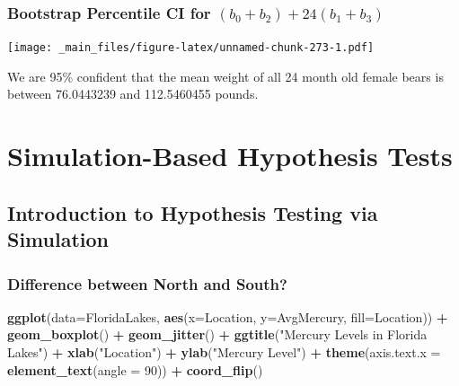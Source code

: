 \documentclass[]{book}
\newenvironment{Shaded}{\begin{snugshade}}{\end{snugshade}}
\newcommand{\KeywordTok}[1]{\textcolor[rgb]{0.13,0.29,0.53}{\textbf{#1}}}
\newcommand{\DataTypeTok}[1]{\textcolor[rgb]{0.13,0.29,0.53}{#1}}
\newcommand{\DecValTok}[1]{\textcolor[rgb]{0.00,0.00,0.81}{#1}}
\newcommand{\StringTok}[1]{\textcolor[rgb]{0.31,0.60,0.02}{#1}}
\newcommand{\OperatorTok}[1]{\textcolor[rgb]{0.81,0.36,0.00}{\textbf{#1}}}
\newcommand{\NormalTok}[1]{#1}
\begin{document}
\subsection{\texorpdfstring{Bootstrap Percentile CI for
\((b_0 + b_2) + 24(b_1+b_3)\)}{Bootstrap Percentile CI for (b\_0 + b\_2) + 24(b\_1+b\_3)}}\label{bootstrap-percentile-ci-for-b_0-b_2-24b_1b_3-1}

\texttt{[image: \_main\_files/figure-latex/unnamed-chunk-273-1.pdf]}

We are 95\% confident that the mean weight of all 24 month old female
bears is between 76.0443239 and 112.5460455 pounds.

\chapter{Simulation-Based Hypothesis
Tests}\label{simulation-based-hypothesis-tests}

\section{Introduction to Hypothesis Testing via
Simulation}\label{introduction-to-hypothesis-testing-via-simulation}

\subsection{Difference between North and
South?}\label{difference-between-north-and-south}

\begin{Shaded}
\begin{Highlighting}[]
\KeywordTok{ggplot}\NormalTok{(}\DataTypeTok{data=}\NormalTok{FloridaLakes,  }\KeywordTok{aes}\NormalTok{(}\DataTypeTok{x=}\NormalTok{Location, }\DataTypeTok{y=}\NormalTok{AvgMercury, }\DataTypeTok{fill=}\NormalTok{Location)) }\OperatorTok{+}\StringTok{ }
\StringTok{  }\KeywordTok{geom_boxplot}\NormalTok{() }\OperatorTok{+}\StringTok{   }\KeywordTok{geom_jitter}\NormalTok{() }\OperatorTok{+}\StringTok{  }\KeywordTok{ggtitle}\NormalTok{(}\StringTok{"Mercury Levels in Florida Lakes"}\NormalTok{) }\OperatorTok{+}\StringTok{ }
\StringTok{  }\KeywordTok{xlab}\NormalTok{(}\StringTok{"Location"}\NormalTok{) }\OperatorTok{+}\StringTok{ }\KeywordTok{ylab}\NormalTok{(}\StringTok{"Mercury Level"}\NormalTok{) }\OperatorTok{+}\StringTok{  }\KeywordTok{theme}\NormalTok{(}\DataTypeTok{axis.text.x =} \KeywordTok{element_text}\NormalTok{(}\DataTypeTok{angle =} \DecValTok{90}\NormalTok{)) }\OperatorTok{+}\StringTok{ }\KeywordTok{coord_flip}\NormalTok{()}
\end{Highlighting}
\end{Shaded}
\end{document}
